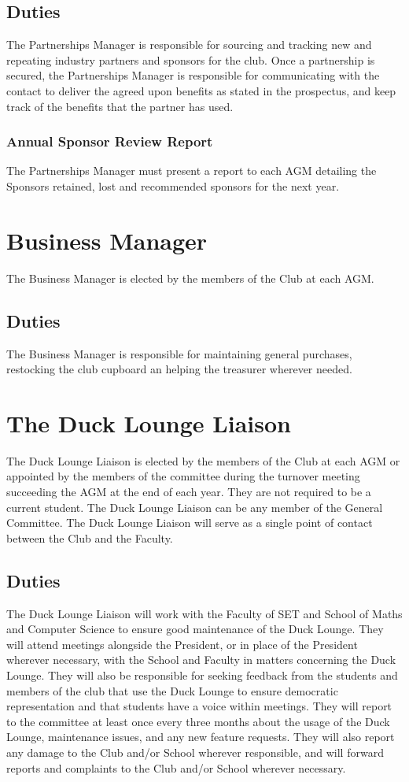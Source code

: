 \documentclass[11pt]{article}
\begin{document}
\subsection{Duties}
The Partnerships Manager is responsible for sourcing and tracking new and repeating industry partners and sponsors for the club.
Once a partnership is secured, the Partnerships Manager is responsible for communicating with the contact to deliver the agreed upon benefits as stated in the prospectus, and keep track of the benefits that the partner has used.
\subsubsection{Annual Sponsor Review Report}
The Partnerships Manager must present a report to each AGM detailing the Sponsors retained, lost and recommended sponsors for the next year.

\section{Business Manager}
The Business Manager is elected by the members of the Club at each AGM.
\subsection{Duties}
The Business Manager is responsible for maintaining general purchases, restocking the club cupboard an helping the treasurer wherever needed.


\section{The Duck Lounge Liaison}
The Duck Lounge Liaison is elected by the members of the Club at each AGM or appointed by the members of the committee during the turnover meeting succeeding the AGM at the end of each year. They are not required to be a current student. The Duck Lounge Liaison can be any member of the General Committee. The Duck Lounge Liaison will serve as a single point of contact between the Club and the Faculty.
\subsection{Duties}
The Duck Lounge Liaison will work with the Faculty of SET and School of Maths and Computer Science to ensure good maintenance of the Duck Lounge.
They will attend meetings alongside the President, or in place of the President wherever necessary, with the School and Faculty in matters concerning the Duck Lounge.
They will also be responsible for seeking feedback from the students and members of the club that use the Duck Lounge to ensure democratic representation and that students have a voice within meetings.
They will report to the committee at least once every three months about the usage of the Duck Lounge, maintenance issues, and any new feature requests. They will also report any damage to the Club and/or School wherever responsible, and will forward reports and complaints to the Club and/or School wherever necessary.
\end{document}
